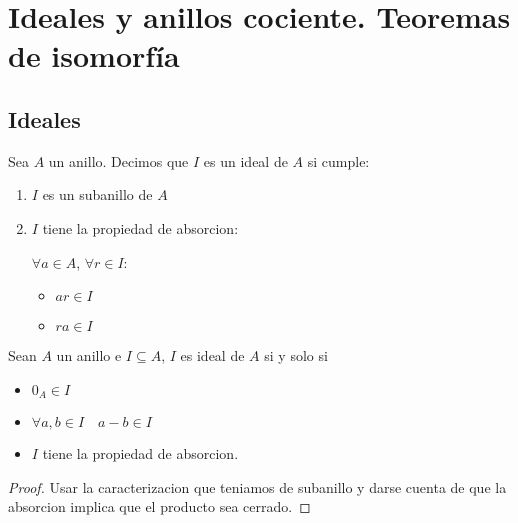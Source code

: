 \section{Ideales y anillos cociente. Teoremas de isomorfía}
\subsection{Ideales}
\begin{definition}
	Sea \(A \) un anillo. Decimos que \(I \) es un ideal de \(A \) si cumple:
	\begin{enumerate}
		\item \(I \) es un subanillo de \(A \)
		\item \(I \) tiene la propiedad de absorcion:
		      
		      \(\forall a \in A \), \(\forall r \in I \):
		      
		      \begin{itemize}
			      \item \(ar \in I \)
			      \item \(ra \in I \)
		      \end{itemize}
	\end{enumerate}
\end{definition}
\begin{proposition}
	Sean \(A \) un anillo e \(I \subseteq A \), \(I \) es ideal de \(A \) si y solo si
	\begin{itemize}
		\item \(0_A \in I \)
		\item \(\forall a,b \in I \quad a - b \in I \)
		\item \(I \) tiene la propiedad de absorcion.
	\end{itemize}
\end{proposition}
\begin{proof}
	Usar la caracterizacion que teniamos de subanillo y darse cuenta de que la absorcion implica que el producto sea cerrado.
\end{proof}

